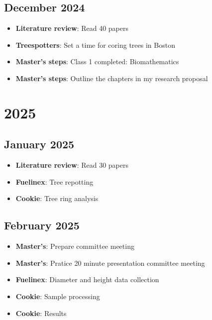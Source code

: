 \documentclass{article}
\begin{document}
\subsection*{December 2024}
\begin{itemize}
    \item \textbf{Literature review}: Read 40 papers 
    \item \textbf{Treespotters}: Set a time for coring trees in Boston
    \item \textbf{Master's steps}: Class 1 completed: Biomathematics
    \item \textbf{Master's steps}: Outline the chapters in my research proposal
\end{itemize}

\section*{\centering \Large 2025}

\subsection*{January 2025}
\begin{itemize}
    \item \textbf{Literature review}: Read 30 papers
    \item \textbf{Fuelinex}: Tree repotting
    \item \textbf{Cookie}: Tree ring analysis
\end{itemize}

\subsection*{February 2025}
\begin{itemize}
    \item \textbf{Master's}: Prepare committee meeting
    \item \textbf{Master's}: Pratice 20 minute presentation committee meeting
    \item \textbf{Fuelinex}: Diameter and height data collection
    \item \textbf{Cookie}: Sample processing
    \item \textbf{Cookie}: Results
\end{itemize}
\end{document}
